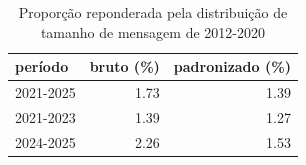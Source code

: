 \begin{table}[htbp]
\centering
\caption{Proporção reponderada pela distribuição de tamanho de mensagem de 2012-2020}
\label{tab:mensagem_padronizada}
\begin{tabular}{lrr}
\toprule
período & bruto (\%) & padronizado (\%) \\
\midrule
2021-2025 & 1.73 & 1.39 \\
2021-2023 & 1.39 & 1.27 \\
2024-2025 & 2.26 & 1.53 \\
\bottomrule
\end{tabular}
\end{table}
